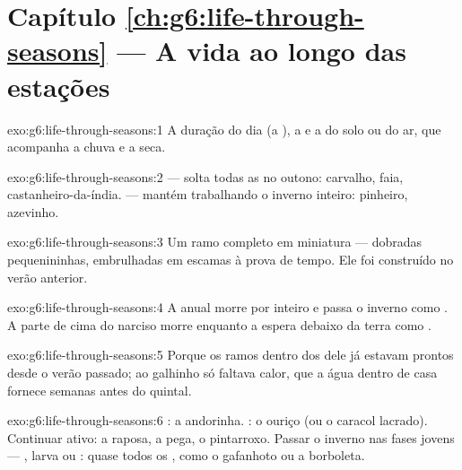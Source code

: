 \section*{Capítulo \ref{ch:g6:life-through-seasons} --- A vida ao longo das estações}

\begin{solution}{exo:g6:life-through-seasons:1}
A duração do dia (a ), a  e a  do solo ou do ar,
que acompanha a chuva e a seca.
\end{solution}

\begin{solution}{exo:g6:life-through-seasons:2}
 --- solta todas as  no outono: carvalho, faia,
castanheiro-da-índia.  --- mantém  trabalhando o
inverno inteiro: pinheiro, azevinho.
\end{solution}

\begin{solution}{exo:g6:life-through-seasons:3}
Um ramo completo em miniatura ---  dobradas pequenininhas,
embrulhadas em escamas à prova de tempo. Ele foi construído no verão
anterior.
\end{solution}

\begin{solution}{exo:g6:life-through-seasons:4}
A anual morre por inteiro e passa o inverno como . A parte de
cima do narciso morre enquanto a  espera debaixo da terra como
.
\end{solution}

\begin{solution}{exo:g6:life-through-seasons:5}
Porque os ramos dentro dos  dele já estavam prontos desde o
verão passado; ao galhinho só faltava calor, que a água dentro de
casa fornece semanas antes do quintal.
\end{solution}

\begin{solution}{exo:g6:life-through-seasons:6}
: a andorinha. : o ouriço (ou o caracol lacrado).
Continuar ativo: a raposa, a pega, o pintarroxo. Passar o inverno nas
fases jovens --- , larva ou : quase todos os ,
como o gafanhoto ou a borboleta.
\end{solution}

